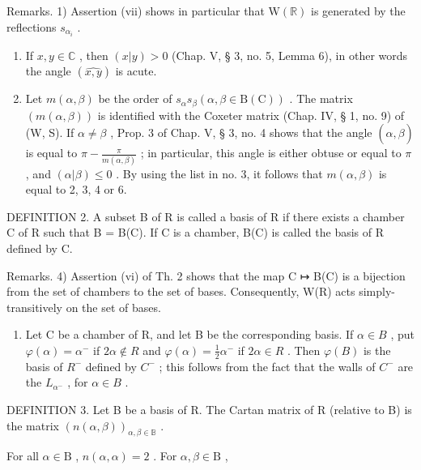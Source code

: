 Remarks. 1) Assertion (vii) shows in particular that \(\mathrm{W}(\mathbb{R})\) is generated by the reflections \(s_{\alpha_i}\) .

\begin{enumerate}
\def\labelenumi{\arabic{enumi})}
\setcounter{enumi}{1}
\item
  If \(x, y \in \mathbb{C}\) , then \((x|y) > 0\) (Chap. V, § 3, no. 5, Lemma 6), in other words the angle \((\widehat{x,y})\) is acute.
\item
  Let \(m(\alpha, \beta)\) be the order of \(s_{\alpha} s_{\beta} (\alpha, \beta \in \mathrm{B}(\mathrm{C}))\) . The matrix \((m(\alpha, \beta))\) is identified with the Coxeter matrix (Chap. IV, § 1, no. 9) of (W, S). If \(\alpha \neq \beta\) , Prop. 3 of Chap. V, § 3, no. 4 shows that the angle \((\widehat{\alpha, \beta})\) is equal to \(\pi - \frac{\pi}{m(\alpha, \beta)}\) ; in particular, this angle is either obtuse or equal to \(\pi\) , and \((\alpha | \beta) \leqslant 0\) . By using the list in no. 3, it follows that \(m(\alpha, \beta)\) is equal to 2, 3, 4 or 6.
\end{enumerate}

DEFINITION 2. A subset B of R is called a basis of R if there exists a chamber C of R such that B = B(C). If C is a chamber, B(C) is called the basis of R defined by C.

Remarks. 4) Assertion (vi) of Th. 2 shows that the map C ↦ B(C) is a bijection from the set of chambers to the set of bases. Consequently, W(R) acts simply-transitively on the set of bases.

\begin{enumerate}
\def\labelenumi{\arabic{enumi})}
\setcounter{enumi}{4}
\tightlist
\item
  Let C be a chamber of R, and let B be the corresponding basis. If \(\alpha\in B\) , put \(\varphi(\alpha)=\alpha^{-}\) if \(2\alpha\notin R\) and \(\varphi(\alpha)=\frac{1}{2}\alpha^{-}\) if \(2\alpha\in R\) . Then \(\varphi(B)\) is the basis of \(R^{-}\) defined by \(C^{-}\) ; this follows from the fact that the walls of \(C^{-}\) are the \(L_{\alpha^{-}}\) , for \(\alpha\in B\) .
\end{enumerate}

DEFINITION 3. Let B be a basis of R. The Cartan matrix of R (relative to B) is the matrix \((n(\alpha,\beta))_{\alpha,\beta\in\mathbb{B}}\) .

For all \(\alpha \in \mathrm{B}\) , \(n(\alpha, \alpha) = 2\) . For \(\alpha, \beta \in \mathrm{B}\) ,

